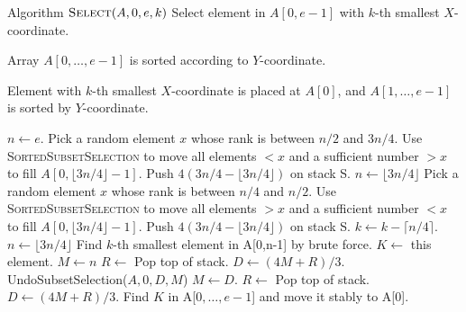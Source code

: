 \begin{algorithm}
  \caption{Algorithm
    $\textsc{Select}(A,0,e,k)$ Select element in $A[0,e-1]$ with $k$-th smallest $X$-coordinate.}

  \label{alg:selectk}
  \begin{algorithmic}[1]
    \REQUIRE Array $A[0,\ldots, e-1]$ is sorted according to $Y$-coordinate.
    
    \ENSURE Element with $k$-th smallest $X$-coordinate is placed at
$A[0]$, and $A[1,\ldots, e-1]$ is sorted by $Y$-coordinate.

    \STATE $n \gets e$. 
             \STATE Pick a random element $x$ whose rank is between $n/2$ and $3n/4$.
             \STATE Use \textsc{SortedSubsetSelection} to move all elements $< x$ and a sufficient number $> x$ to fill $A[0,\lfloor 3n/4 \rfloor - 1]$.
             \STATE Push $4(3n/4 - \lfloor 3n/4 \rfloor)$ on stack S.
             \STATE $n \gets \lfloor 3n/4 \rfloor$
          \ELSE
             \STATE Pick a random element $x$ whose rank is between $n/4$ and $n/2$.
             \STATE Use \textsc{SortedSubsetSelection} to move all elements $> x$ and a sufficient number $< x$ to fill $A[0,\lfloor 3n/4 \rfloor - 1]$.
             \STATE Push $4(3n/4 - \lfloor 3n/4 \rfloor)$ on stack S.
             \STATE $k \gets k - \lceil n/4 \rceil$.
             \STATE $n \gets \lfloor 3n/4 \rfloor$
          \ENDIF
    \ENDWHILE
    \STATE Find $k$-th smallest element in A[0,n-1] by brute force. $K
\gets$ this element.
    \STATE $M \gets n$
    \STATE $R \gets$ Pop top of stack.
    \STATE $D \gets (4M + R)/3$.
          \STATE UndoSubsetSelection($A,0,D,M$)
          \STATE $M \gets D$.
          \STATE $R \gets$ Pop top of stack.
          \STATE $D \gets (4M + R)/3$.
    \ENDWHILE
    \STATE Find $K$ in A[$0,\ldots, e-1$] and move it stably to A[$0$].
  \end{algorithmic}
\end{algorithm}

